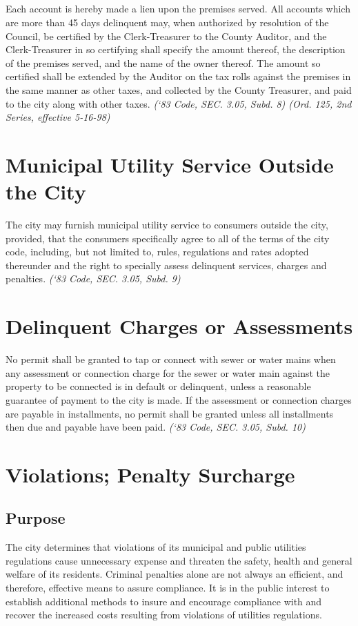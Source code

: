 \documentclass[code.tex]{subfiles}
\begin{document}
\subsection{}
Each account is hereby made a lien upon the premises served. All accounts which are more than 45 days delinquent may, when authorized by resolution of the Council, be certified by the Clerk-Treasurer to the County Auditor, and the Clerk-Treasurer in so certifying shall specify the amount thereof, the description of the premises served, and the name of the owner thereof. The amount so certified shall be extended by the Auditor on the tax rolls against the premises in the same manner as other taxes, and collected by the County Treasurer, and paid to the city along with other taxes.\newline
\emph{(‘83 Code, SEC. 3.05, Subd. 8) (Ord. 125, 2nd Series, effective 5-16-98)}
\section{Municipal Utility Service Outside the City}
The city may furnish municipal utility service to consumers outside the city, provided, that the consumers specifically agree to all of the terms of the city code, including, but not limited to, rules, regulations and rates adopted thereunder and the right to specially assess delinquent services, charges and penalties.\newline
\emph{(‘83 Code, SEC. 3.05, Subd. 9)}
\section{Delinquent Charges or Assessments}
No permit shall be granted to tap or connect with sewer or water mains when any assessment or connection charge for the sewer or water main against the property to be connected is in default or delinquent, unless a reasonable guarantee of payment to the city is made.  If the assessment or connection charges are payable in installments, no permit shall be granted unless all installments then due and payable have been paid.\newline
\emph{(‘83 Code, SEC. 3.05, Subd. 10)}

\setcounter{section}{97}
\section{Violations; Penalty Surcharge}
\subsection{Purpose}
The city determines that violations of its municipal and public utilities regulations cause unnecessary expense and threaten the safety, health and general welfare of its residents.  Criminal penalties alone are not always an efficient, and therefore, effective means to assure compliance.  It is in the public interest to establish additional methods to insure and encourage compliance with and recover the increased costs resulting from violations of utilities regulations.
\end{document}
